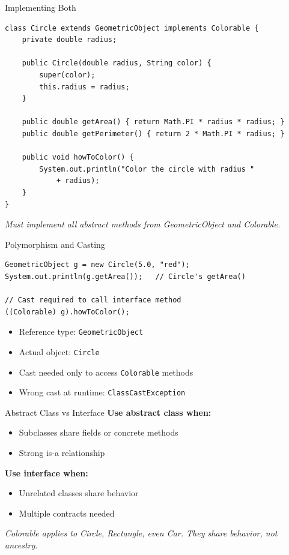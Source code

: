 \documentclass{beamer}
\begin{document}
\begin{frame}[fragile]{Implementing Both}
\begin{lstlisting}
class Circle extends GeometricObject implements Colorable {
    private double radius;

    public Circle(double radius, String color) {
        super(color);
        this.radius = radius;
    }

    public double getArea() { return Math.PI * radius * radius; }
    public double getPerimeter() { return 2 * Math.PI * radius; }

    public void howToColor() {
        System.out.println("Color the circle with radius "
            + radius);
    }
}
\end{lstlisting}
\textit{Must implement all abstract methods from GeometricObject and Colorable.}
\end{frame}
\begin{frame}[fragile]{Polymorphism and Casting}
\begin{lstlisting}
GeometricObject g = new Circle(5.0, "red");
System.out.println(g.getArea());   // Circle's getArea()

// Cast required to call interface method
((Colorable) g).howToColor();
\end{lstlisting}
\vspace{0.3cm}
\begin{itemize}
  \item Reference type: \texttt{GeometricObject}
  \item Actual object: \texttt{Circle}
  \item Cast needed only to access \texttt{Colorable} methods
  \item Wrong cast at runtime: \texttt{ClassCastException}
\end{itemize}
\end{frame}
\begin{frame}{Abstract Class vs Interface}
\textbf{Use abstract class when:}
\begin{itemize}
  \item Subclasses share fields or concrete methods
  \item Strong is-a relationship
\end{itemize}
\vspace{0.3cm}
\textbf{Use interface when:}
\begin{itemize}
  \item Unrelated classes share behavior
  \item Multiple contracts needed
\end{itemize}
\vspace{0.3cm}
\textit{Colorable applies to Circle, Rectangle, even Car. They share behavior, not ancestry.}
\end{frame}
\end{document}
